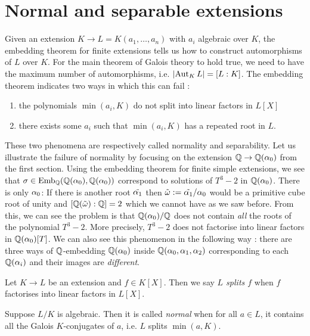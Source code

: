 \documentclass{article}
\begin{document}
\section{Normal and separable extensions}

Given an extension $K \to L = K(a_1 , \dots , a_n)$
with $a_i$ algebraic over $K$,
the embedding theorem for finite extensions tells us
how to construct automorphisms of $L$ over $K$.
For the main theorem of Galois theory to hold true,
we need to have the maximum number of automorphisms,
i.e. $\left\vert \operatorname{Aut}_K L \right\vert = [L : K]$.
The embedding theorem indicates two ways in which this can fail : 
\begin{enumerate}
  \item the polynomials $\min(a_i , K)$ do not split into
  linear factors in $L[X]$
  \item there exists some $a_i$ such that
  $\min(a_i , K)$ has a repeated root in $L$.
\end{enumerate}
These two phenomena are respectively called normality and separability.
Let us illustrate the failure of normality
by focusing on the extension
$\mathbb{Q} \to \mathbb{Q}(\alpha_0)$ from the first section.
Using the embedding theorem for finite simple extensions,
we see that $\sigma \in \mathrm{Emb}_{\mathbb{Q}}(\mathbb{Q}(\alpha_0) , \mathbb{Q}(\alpha_0))$
correspond to solutions of $T^3 - 2$ in $\mathbb{Q}(\alpha_0)$.
There is only $\alpha_0$:
If there is another root $\tilde{\alpha_1}$ then
$\tilde{\omega} := \tilde{\alpha_1} / \alpha_0$ would be a primitive
cube root of unity and $[\mathbb{Q}(\tilde{\omega}) : \mathbb{Q}] = 2$
which we cannot have as we saw before.
From this, we can see the problem is that 
$\mathbb{Q}(\alpha_0) / \mathbb{Q}$ does not contain
\emph{all} the roots of the polynomial $T^3 - 2$.
More precisely, $T^3 - 2$ does not factorise into linear factors
in $\mathbb{Q}(\alpha_0)[T]$.
We can also see this phenomenon in the following way : 
there are three ways of $\mathbb{Q}$-embedding $\mathbb{Q}(\alpha_0)$ inside 
$\mathbb{Q}(\alpha_0 , \alpha_1 , \alpha_2)$ corresponding to each $\mathbb{Q}(\alpha_i)$
and their images are \emph{different}.

\begin{dfn}  
  
  Let $K \to L$ be an extension and $f \in K[X]$. 
  Then we say \emph{$L$ splits $f$} when 
  $f$ factorises into linear factors in $L[X]$. 

  Suppose $L/K$ is algebraic. 
  Then it is called \emph{normal} when for all $a \in L$,  
  it contains all the Galois $K$-conjugates of $a$,
  i.e. $L$ splits $\min(a,K)$. 
\end{dfn}
\end{document}
